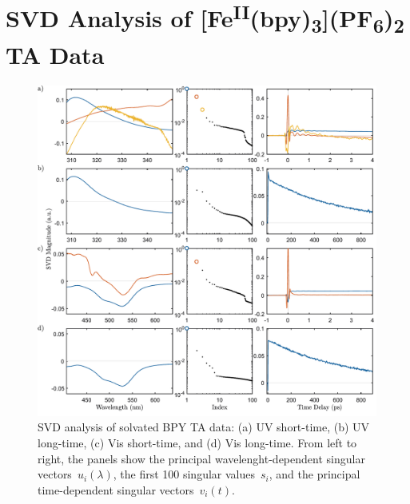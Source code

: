 \chapter{SVD Analysis of [Fe\textsuperscript{II}(bpy)\textsubscript{3}](PF\textsubscript{6})\textsubscript{2} TA Data}
\label{ap: sco-bpy}

\begin{figure}[hp]
  \centering
  \includegraphics[width = \textwidth]{Figures/fig_BPY_data_aqueous_svd.pdf}
  \caption[SVD analysis of solvated BPY TA data.]{
    SVD analysis of solvated BPY TA data:
    (a) UV short-time, (b) UV long-time, (c) Vis short-time, and (d) Vis long-time.
    From left to right, the panels show
    the principal wavelenght-dependent singular vectors~$u_i(\lambda)$,
    the first 100 singular values~$s_i$,
    and the principal time-dependent singular vectors~$v_i(t)$.
  }
  \label{fig: BPY-data-aqueous-svd}
\end{figure}

